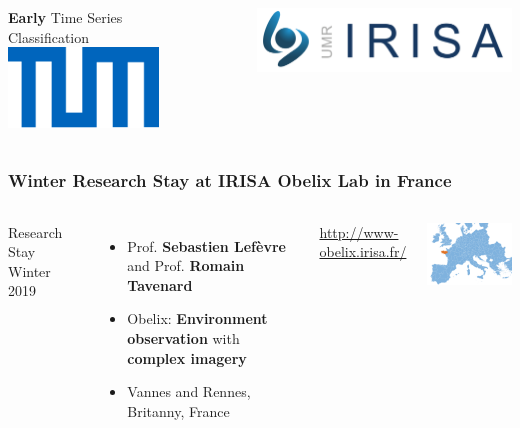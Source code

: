 

{
	\begin{frame}[plain]
	\vfill
	\Huge\color{tumbluedark}
	\begin{columns}
		\vspace{4em}
		
		\hfill \textbf{Early} Time Series \\\hfill Classification
		\includegraphics[width=4cm]{images/TUM-blue}
		
		\vspace{1em}
		\includegraphics[width=7cm]{images/Irisa}
	\end{columns}
	
	\vfill
\end{frame}
}


\begin{frame}
	\frametitle{Winter Research Stay at IRISA Obelix Lab in France}
	
	\begin{columns}
		\column{.5\textwidth}
		
		Research Stay Winter 2019
		\begin{itemize}[itemsep=1em]
			\item Prof. \textbf{Sebastien Lefèvre} and Prof. \textbf{Romain Tavenard}
			\item Obelix: \textbf{Environment observation} with \textbf{complex imagery}
			\item Vannes and Rennes, Britanny, France
		\end{itemize}
		
		\vspace{1em}
		\url{http://www-obelix.irisa.fr/}
		
		\column{.5\textwidth}
		
		\includegraphics[width=5cm]{images/map/europe}
		
	\end{columns}
	
\end{frame}


